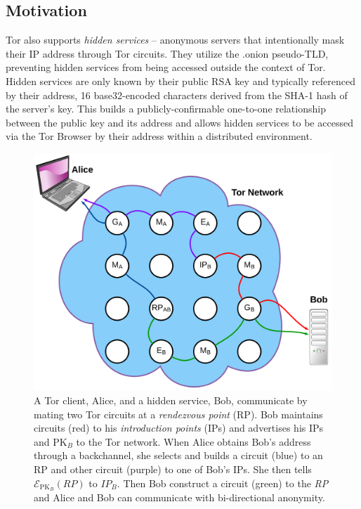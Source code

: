 \documentclass{sig-alternate}
\begin{document}
\subsection{Motivation}

Tor also supports \emph{hidden services} -- anonymous servers that intentionally mask their IP address through Tor circuits. They utilize the .onion pseudo-TLD, preventing hidden services from being accessed outside the context of Tor. Hidden services are only known by their public RSA key and typically referenced by their address, 16 base32-encoded characters derived from the SHA-1 hash of the server's key. This builds a publicly-confirmable one-to-one relationship between the public key and its address and allows hidden services to be accessed via the Tor Browser by their address within a distributed environment.

\begin{figure}[htbp]
	\centering
	\includegraphics[width=\linewidth]{../images/LucidCharts/Hidden_Services.pdf}
	\caption{A Tor client, Alice, and a hidden service, Bob, communicate by mating two Tor circuits at a \emph{rendezvous point} (RP). Bob maintains circuits (red) to his \emph{introduction points} (IPs) and advertises his IPs and $ \mathrm{PK}_{B} $ to the Tor network. When Alice obtains Bob's address through a backchannel, she selects and builds a circuit (blue) to an RP and other circuit (purple) to one of Bob's IPs. She then tells $ \mathcal{E}_{\mathrm{PK}_{B}}(\mathit{RP}) $ to $ \mathit{IP}_{B}$. Then Bob construct a circuit (green) to the \emph{RP} and Alice and Bob can communicate with bi-directional anonymity.\cite{overlier2006locating}}
\end{figure}
\end{document}
